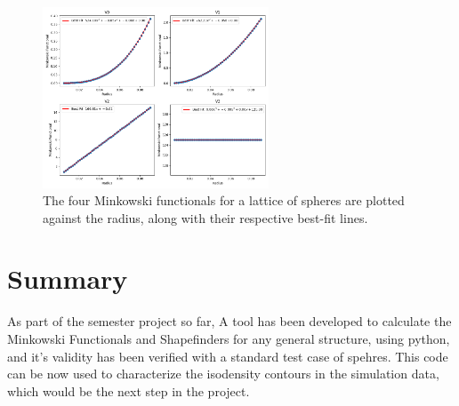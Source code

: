 \documentclass{article}
\begin{document}
\begin{figure}[h!] 
    \centering 
    \includegraphics[width=0.6\textwidth]{Images/grid_radius_variance.png} 
    \caption{The four Minkowski functionals for a lattice of spheres are plotted against the radius, along with their respective best-fit lines.} 
    \label{fig:lattice_spheres_plot} 
\end{figure}

\section{Summary}

As part of the semester project so far, A tool has been developed to calculate the Minkowski Functionals and Shapefinders for any general structure, using python, and it's validity has been verified with a standard test case of spehres. This code can be now used to characterize the isodensity contours in the simulation data, which would be the next step in the project. 


\end{document}
